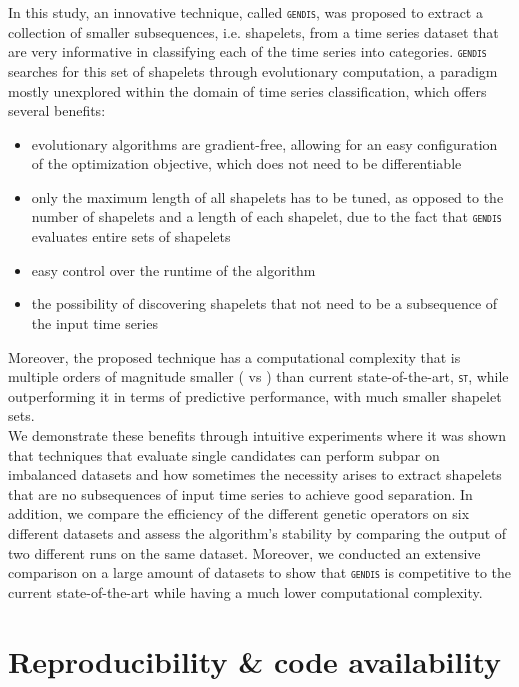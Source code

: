 \documentclass[runningheads]{llncs}
\begin{document}
In this study, an innovative technique, called \textsc{\texttt{gendis}}, was proposed to extract a collection of smaller subsequences, i.e. shapelets, from a time series dataset that are very informative in classifying each of the time series into categories. \textsc{\texttt{gendis}} searches for this set of shapelets through evolutionary computation, a paradigm mostly unexplored within the domain of time series classification, which offers several benefits:
\begin{itemize}
	\item evolutionary algorithms are gradient-free, allowing for an easy configuration of the optimization objective, which does not need to be differentiable
	\item only the maximum length of all shapelets has to be tuned, as opposed to the number of shapelets and a length of each shapelet, due to the fact that \textsc{\texttt{gendis}} evaluates entire sets of shapelets
	\item easy control over the runtime of the algorithm
	\item the possibility of discovering shapelets that not need to be a subsequence of the input time series
\end{itemize}
Moreover, the proposed technique has a computational complexity that is multiple orders of magnitude smaller ( vs ) than current state-of-the-art, \textsc{\texttt{st}}, while outperforming it in terms of predictive performance, with much smaller shapelet sets. \\

We demonstrate these benefits through intuitive experiments where it was shown that techniques that evaluate single candidates can perform subpar on imbalanced datasets and how sometimes the necessity arises to extract shapelets that are no subsequences of input time series to achieve good separation. In addition, we compare the efficiency of the different genetic operators on six different datasets and assess the algorithm's stability by comparing the output of two different runs on the same dataset. Moreover, we conducted an extensive comparison on a large amount of datasets to show that \textsc{\texttt{gendis}} is competitive to the current state-of-the-art while having a much lower computational complexity.

\section{Reproducibility \& code availability}\label{sec:reproducibility}
\end{document}
